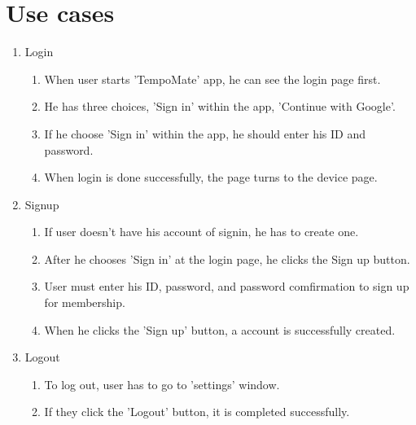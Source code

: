 \newpage
\section{\Large{Use cases}}

\begin{enumerate}[label=\arabic*]
    \item Login
    \begin{enumerate}
        \item When user starts 'TempoMate' app, he can see the login page first. \\
        \item He has three choices, 'Sign in' within the app, 'Continue with Google'. \\
        \item If he choose 'Sign in' within the app, he should enter his ID and password. \\
        \item When login is done successfully, the page turns to the device page. \\
    \end{enumerate}

    \item Signup
    \begin{enumerate}
        \item If user doesn't have his account of signin, he has to create one. \\
        \item After he chooses 'Sign in' at the login page, he clicks the Sign up button. \\
        \item User must enter his ID, password, and password comfirmation to sign up for membership. \\
        \item When he clicks the 'Sign up' button, a account is successfully created. \\
    \end{enumerate}

    \item Logout
    \begin{enumerate}
        \item To log out, user has to go to 'settings' window.\\
        \item If they click the 'Logout' button, it is completed successfully.\\
    \end{enumerate}
\end{enumerate}

